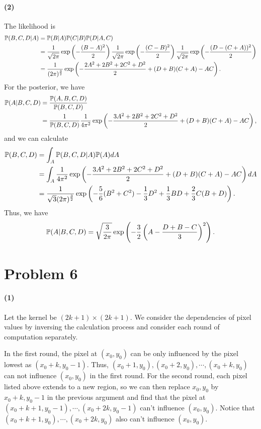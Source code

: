\documentclass[a4 paper,12pt]{article}
\begin{document}
\paragraph*{(2)}
The likelihood is
\begin{align*}
\mathbb{P}(B,C,D|A)&=\mathbb{P}(B|A)\mathbb{P}(C|B)\mathbb{P}(D|A,C)\\
&=\frac{1}{\sqrt{2\pi}}\exp\left(-\frac{(B-A)^2}{2}\right)\frac{1}{\sqrt{2\pi}}\exp \left(-\frac{(C-B)^2}{2}\right)\frac{1}{\sqrt{2\pi}}\exp \left(-\frac{(D-(C+A))^2}{2}\right)\\
&=\frac{1}{(2\pi)^{\frac{3}{2}}}\exp\left(-\frac{2A^2+2B^2+2C^2+D^2}{2}+(D+B)(C+A)-AC\right).
\end{align*} For the posterior, we have
\begin{align*}
\mathbb{P}(A|B,C,D)&=\frac{\mathbb{P}(A,B,C,D)}{\mathbb{P}(B,C,D)}\\
&=\frac{1}{\mathbb{P}(B,C,D)}\frac{1}{4\pi^2}\exp\left(-\frac{3A^2+2B^2+2C^2+D^2}{2}+(D+B)(C+A)-AC\right),
\end{align*} and we can calculate
\begin{align*}
\mathbb{P}(B,C,D)&=\int_A \mathbb{P}(B,C,D|A)\mathbb{P}(A)dA\\
&=\int_A \frac{1}{4\pi^2}\exp\left(-\frac{3A^2+2B^2+2C^2+D^2}{2}+(D+B)(C+A)-AC\right)dA\\
&=\frac{1}{\sqrt{3}(2\pi)^{\frac{3}{2}}}\exp \left(-\frac{5}{6}(B^2+C^2)-\frac{1}{3}D^2+\frac{1}{3}BD+\frac{2}{3}C(B+D)\right).
\end{align*}
Thus, we have
\[
\mathbb{P}(A|B,C,D)=\sqrt{\frac{3}{2\pi}}\exp\left(
-\frac{3}{2}\left(A-\frac{D+B-C}{3}\right)^2\right).
\]
\section*{Problem 6}
\paragraph*{(1)}
Let the kernel be $(2k+1)\times (2k+1)$. We consider the dependencies of pixel values by inversing the calculation process and consider each round of computation separately. 

In the first round, the pixel at $(x_0,y_0)$ can be only influenced by the pixel lowest as $(x_0+k,y_0-1)$. Thus, $(x_0+1,y_0),(x_0+2,y_0),\cdots,(x_0+k,y_0)$ can not influence $(x_0,y_0)$ in the first round. For the second round, each pixel listed above extends to a new region, so we can then replace $x_0,y_0$ by $x_0+k,y_0-1$ in the previous argument and find that the pixel at $(x_0+k+1,y_0-1),\cdots,(x_0+2k,y_0-1)$ can't influence $(x_0,y_0)$. Notice that $(x_0+k+1,y_0),\cdots,(x_0+2k,y_0)$ also can't influence $(x_0,y_0)$. 
\end{document}
